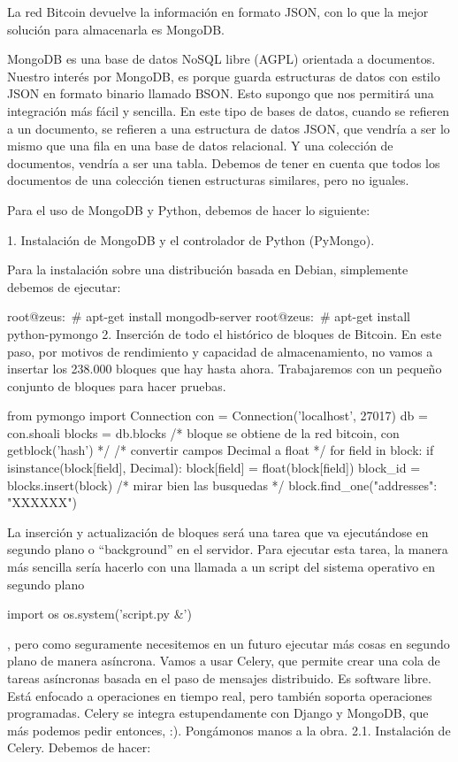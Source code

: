 \documentclass[a4paper, 12pt]{book}
\begin{document}
La red Bitcoin devuelve la información en formato JSON, con lo que la mejor solución para almacenarla es MongoDB.

MongoDB es una base de datos NoSQL libre (AGPL) orientada a documentos. Nuestro interés por MongoDB, es porque guarda estructuras de datos con estilo JSON en formato binario llamado BSON. Esto supongo que nos permitirá una integración más fácil y sencilla. En este tipo de bases de datos, cuando se refieren a un documento, se refieren a una estructura de datos JSON, que vendría a ser lo mismo que una fila en una base de datos relacional. Y una colección de documentos, vendría a ser una tabla. Debemos de tener en cuenta que todos los documentos de una colección tienen estructuras similares, pero no iguales.

Para el uso de MongoDB y Python, debemos de hacer lo siguiente:

1. Instalación de MongoDB y el controlador de Python (PyMongo).

Para la instalación sobre una distribución basada en Debian, simplemente debemos de ejecutar:

root@zeus:~# apt-get install mongodb-server
root@zeus:~# apt-get install python-pymongo
2. Inserción de todo el histórico de bloques de Bitcoin.
En este paso, por motivos de rendimiento y capacidad de almacenamiento, no vamos a insertar los 238.000 bloques que hay hasta ahora. Trabajaremos con un pequeño conjunto de bloques para hacer pruebas.

from pymongo import Connection
con = Connection('localhost', 27017)
db = con.shoali
blocks = db.blocks
/* bloque se obtiene de la red bitcoin, con getblock('hash') */
/* convertir campos Decimal a float */
for field in block:
  if isinstance(block[field], Decimal):
    block[field] = float(block[field])
block_id = blocks.insert(block)
/* mirar bien las busquedas */
block.find_one({"addresses": "XXXXXX"})

La inserción y actualización de bloques será una tarea que va ejecutándose en segundo plano o “background”  en el servidor. Para ejecutar esta tarea, la manera más sencilla sería hacerlo con una llamada a un script del sistema operativo en segundo plano

import os
os.system('script.py &')

, pero como seguramente necesitemos en un futuro ejecutar más cosas en segundo plano de manera asíncrona. Vamos a usar Celery, que permite crear una cola de tareas asíncronas basada en el paso de mensajes distribuido. Es software libre. Está enfocado a operaciones en tiempo real, pero también soporta operaciones programadas. Celery se integra estupendamente con Django y MongoDB, que más podemos pedir entonces, :). Pongámonos manos a la obra.
2.1. Instalación de Celery.
Debemos de hacer:
\end{document}
